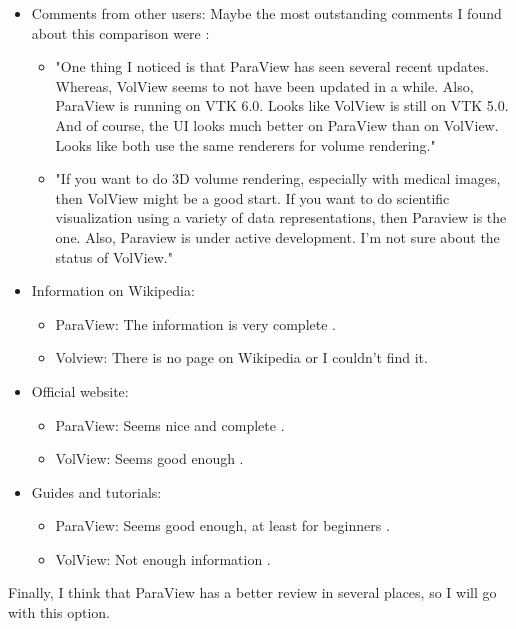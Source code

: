 \documentclass{article}
\begin{document}
  \begin{itemize}
    \item Comments from other users: Maybe the most outstanding comments I found about this comparison were \cite{website:paraview_vs_volview}:
    \begin{itemize}
      \item "One thing I noticed is that ParaView has seen several recent updates. Whereas, VolView seems to not have been updated in a while. Also, ParaView is running on VTK 6.0. Looks like VolView is still on VTK 5.0. And of course, the UI looks much better on ParaView than on VolView. Looks like both use the same renderers for volume rendering."
      \item "If you want to do 3D volume rendering, especially with medical images, then VolView might be a good start. If you want to do scientific visualization using a variety of data representations, then Paraview is the one. Also, Paraview is under active development. I'm not sure about the status of VolView."
    \end{itemize}
    \item Information on Wikipedia:
    \begin{itemize}
      \item ParaView: The information is very complete \cite{wiki:paraview}.
      \item Volview: There is no page on Wikipedia or I couldn't find it.
    \end{itemize}
    \item Official website:
    \begin{itemize}
      \item ParaView: Seems nice and complete \cite{website:paraview_official}.
      \item VolView: Seems good enough \cite{website:volview_official}.
    \end{itemize}
    \item Guides and tutorials:
    \begin{itemize}
      \item ParaView: Seems good enough, at least for beginners \cite{website:paraview_tuto}.
      \item VolView: Not enough information \cite{website:volview_tuto}.
    \end{itemize}
  \end{itemize}

Finally, I think that ParaView has a better review in several places, so I will go with this option.
\end{document}

